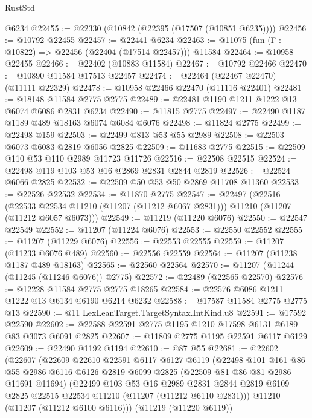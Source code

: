 \begin{lexlean}{RustStd}
\begin{coremodule}
    @6234
@22455 := @22330 (@10842 (@22395 (@17507 (@10851 @6235))))
@22456 := @10792 @22455
@22457 := @22441 @6234
@22463 := @11075 (fun (Γ : @10822) => @22456 (@22404 (@17514 @22457))) @11584
@22464 := @10958 @22455
@22466 := @22402 (@10883 @11584)
@22467 := @10792 @22466
@22470 := @10890 @11584 @17513 @22457
@22474 := @22464 (@22467 @22470) (@11111 @22329)
@22478 := @10958 @22466 @22470 (@11116 @22401)
@22481 := @18148 @11584 @2775 @2775
@22489 := @22481 @1190 @1211 @1222 @13 @6074 @6086 @2831 @6234
@22490 := @11815 @2775
@22497 := @22490 @1187 @1189 @489 @18163 @6074 @6084 @6076
@22498 := @11824 @2775
@22499 := @22498 @159
@22503 := @22499 @813 @53 @55 @2989
@22508 := @22503 @6073 @6083 @2819 @6056 @2825
@22509 := @11683 @2775
@22515 := @22509 @110 @53 @110 @2989 @11723 @11726
@22516 := @22508 @22515
@22524 := @22498 @119 @103 @53 @16 @2869 @2831 @2844 @2819
@22526 := @22524 @6066 @2825
@22532 := @22509 @50 @53 @50 @2869 @11708 @11360
@22533 := @22526 @22532
@22534 := @11870 @2775
@22547 := @22497
    (@22516
      (@22533 @22534 @11210 (@11207 (@11212 @6067 @2831)))
      @11210
      (@11207 (@11212 @6057 @6073)))
@22549 := @11219 (@11220 @6076)
@22550 := @22547 @22549
@22552 := @11207 (@11224 @6076)
@22553 := @22550 @22552
@22555 := @11207 (@11229 @6076)
@22556 := @22553 @22555
@22559 := @11207 (@11233 @6076 @489)
@22560 := @22556 @22559
@22564 := @11207 (@11238 @1187 @489 @18163)
@22565 := @22560 @22564
@22570 := @11207 (@11244 (@11245 (@11246 @6076)) @2775)
@22572 := @22489 (@22565 @22570)
@22576 := @12228 @11584 @2775 @2775 @18265
@22584 := @22576 @6086 @1211 @1222 @13 @6134 @6190 @6214 @6232
@22588 := @17587 @11584 @2775 @2775 @13
@22590 := @11 LexLeanTarget.TargetSyntax.IntKind.u8
@22591 := @17592 @22590
@22602 := @22588 @22591 @2775 @1195 @1210 @17598 @6131 @6189 @83 @3073 @6091 @2825
@22607 := @11809 @2775 @1195 @22591 @6117 @6129
@22609 := @22490 @1192 @1194
@22610 := @87 @55
@22681 := @22602
    (@22607
      (@22609
        @22610
        @22591
        @6117
        @6127
        @6119
        (@22498
          @101
          @161
          @86
          @55
          @2986
          @6116
          @6126
          @2819
          @6099
          @2825
          (@22509 @81 @86 @81 @2986 @11691 @11694)
          (@22499
            @103
            @53
            @16
            @2989
            @2831
            @2844
            @2819
            @6109
            @2825
            @22515
            @22534
            @11210
            (@11207 (@11212 @6110 @2831)))
          @11210
          (@11207 (@11212 @6100 @6116)))
        (@11219 (@11220 @6119))

\end{coremodule}
\end{lexlean}
